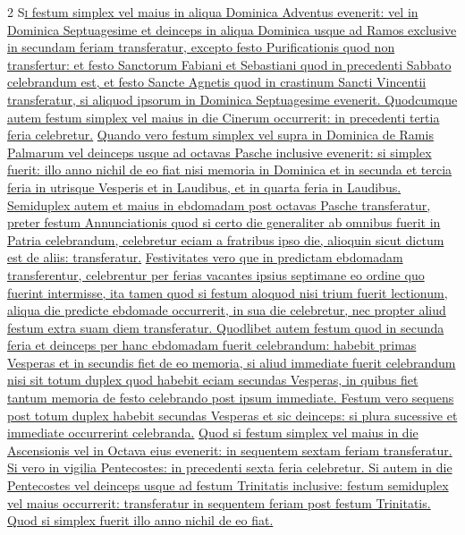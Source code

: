 \begin{multicols*}{2}
{\color{Red} }
\lettrine[lines=2]{\zallmancaps \color{Red} S}{}\ul{\textsc{i} festum simplex vel maius in aliqua Dominica Adventus evenerit: vel in Dominica Septuagesime et deinceps in aliqua Dominica usque ad Ramos exclusive in secundam feriam transferatur, excepto festo Purificationis quod non transfertur: et festo Sanctorum Fabiani et Sebastiani quod in precedenti Sabbato celebrandum est, et festo Sancte Agnetis quod in crastinum Sancti Vincentii transferatur, si aliquod ipsorum in Dominica Septuagesime evenerit. Quodcumque autem festum simplex vel maius in die Cinerum occurrerit: in precedenti tertia feria celebretur.}
\newline \ul{Quando vero festum simplex vel supra in Dominica de Ramis Palmarum vel deinceps usque ad octavas Pasche inclusive evenerit: si simplex fuerit: illo anno nichil de eo fiat nisi memoria in Dominica et in secunda et tercia feria in utrisque Vesperis et in Laudibus, et in quarta feria in Laudibus. Semiduplex autem et maius in ebdomadam post octavas Pasche transferatur, preter festum Annunciationis quod si certo die generaliter ab omnibus fuerit in Patria celebrandum, celebretur eciam a fratribus ipso die, alioquin sicut dictum est de aliis: transferatur.}
\newline \ul{Festivitates vero que in predictam ebdomadam transferentur, celebrentur per ferias vacantes ipsius septimane eo ordine quo fuerint intermisse, ita tamen quod si festum aloquod nisi trium fuerit lectionum, aliqua die predicte ebdomade occurrerit, in sua die celebretur, nec propter aliud festum extra suam diem transferatur. Quodlibet autem festum quod in secunda feria et deinceps per hanc ebdomadam fuerit celebrandum: habebit primas Vesperas et in secundis fiet de eo memoria, si aliud immediate fuerit celebrandum nisi sit totum duplex quod habebit eciam secundas Vesperas, in quibus fiet tantum memoria de festo celebrando post ipsum immediate. Festum vero sequens post totum duplex habebit secundas Vesperas et sic deinceps: si plura sucessive et immediate occurrerint celebranda.}
\newline \ul{Quod si festum simplex vel maius in die Ascensionis vel in Octava eius evenerit: in sequentem
sextam feriam transferatur. Si vero in vigilia Pentecostes: in precedenti sexta feria celebretur. Si autem in die Pentecostes vel deinceps usque ad festum Trinitatis inclusive: festum semiduplex vel maius occurrerit: transferatur in sequentem feriam post festum Trinitatis. Quod si simplex fuerit illo anno nichil de eo fiat.}


\end{multicols*}
